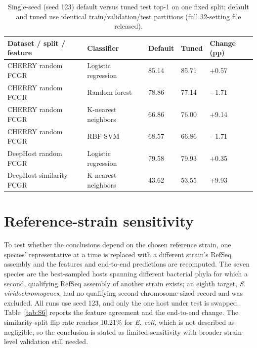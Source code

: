 \documentclass[utf8]{frontiers_suppmat}
\begin{document}
\begin{table}[ht]
\centering
\renewcommand{\arraystretch}{1.25}
\caption{Single-seed (seed 123) default versus tuned test top-1 on one fixed split; default and tuned use identical train/validation/test partitions (full 32-setting file released).}\label{tab:S5}
\footnotesize
\begin{tabular}{p{3.6cm} p{3.2cm} l l l}
\hline
Dataset / split / feature & Classifier & Default & Tuned & Change (pp) \\
\hline
CHERRY random FCGR & Logistic regression & 85.14 & 85.71 & +0.57 \\
CHERRY random FCGR & Random forest & 78.86 & 77.14 & $-1.71$ \\
CHERRY random FCGR & K-nearest neighbors & 66.86 & 76.00 & +9.14 \\
CHERRY random FCGR & RBF SVM & 68.57 & 66.86 & $-1.71$ \\
DeepHost random FCGR & Logistic regression & 79.58 & 79.93 & +0.35 \\
DeepHost similarity FCGR & K-nearest neighbors & 43.62 & 53.55 & +9.93 \\
\hline
\end{tabular}
\end{table}

\section{Reference-strain sensitivity}

To test whether the conclusions depend on the chosen reference strain, one species'
representative at a time is replaced with a different strain's RefSeq assembly and the features
and end-to-end predictions are recomputed. The seven species are the best-sampled hosts
spanning different bacterial phyla for which a second, qualifying RefSeq assembly of another
strain exists; an eighth target, \textit{S. viridochromogenes}, had no qualifying second
chromosome-sized record and was excluded. All runs use seed 123, and only the one host under
test is swapped. Table~\ref{tab:S6} reports the feature agreement and the end-to-end change.
The similarity-split flip rate reaches 10.21\% for \textit{E. coli}, which is not described as
negligible, so the conclusion is stated as limited sensitivity with broader strain-level
validation still needed.
\end{document}
